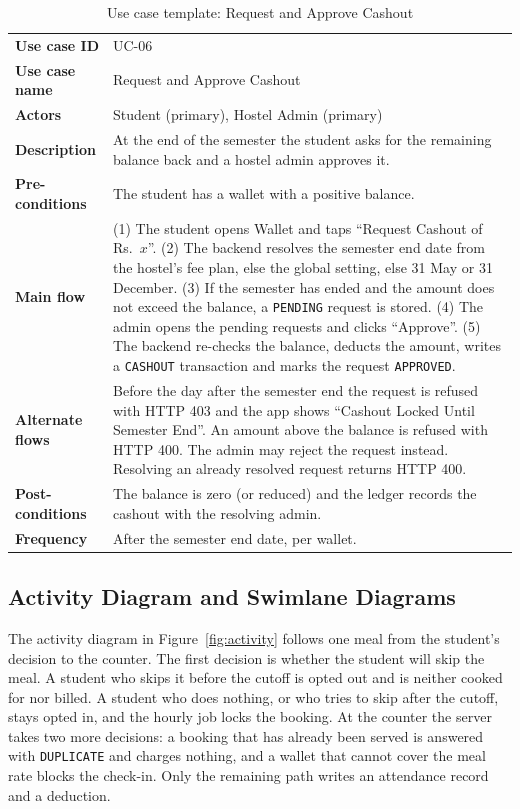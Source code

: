 \documentclass[11pt,a4paper]{article}
\begin{document}
\begin{table}[H]
\centering
\caption{Use case template: Request and Approve Cashout}
\label{tab:uc6}
\begin{tabular}{@{}L{3.1cm}L{11.7cm}@{}}
\toprule
\textbf{Use case ID} & UC-06\\
\textbf{Use case name} & Request and Approve Cashout\\
\textbf{Actors} & Student (primary), Hostel Admin (primary)\\
\textbf{Description} & At the end of the semester the student asks for the
remaining balance back and a hostel admin approves it.\\
\textbf{Pre-conditions} & The student has a wallet with a positive balance.\\
\textbf{Main flow} & (1) The student opens Wallet and taps ``Request Cashout of
Rs.~$x$''. (2) The backend resolves the semester end date from the hostel's fee
plan, else the global setting, else 31 May or 31 December. (3) If the semester
has ended and the amount does not exceed the balance, a \texttt{PENDING} request
is stored. (4) The admin opens the pending requests and clicks ``Approve''.
(5) The backend re-checks the balance, deducts the amount, writes a
\texttt{CASHOUT} transaction and marks the request \texttt{APPROVED}.\\
\textbf{Alternate flows} & Before the day after the semester end the request is
refused with HTTP 403 and the app shows ``Cashout Locked Until Semester End''.
An amount above the balance is refused with HTTP 400. The admin may reject the
request instead. Resolving an already resolved request returns HTTP 400.\\
\textbf{Post-conditions} & The balance is zero (or reduced) and the ledger
records the cashout with the resolving admin.\\
\textbf{Frequency} & After the semester end date, per wallet.\\
\bottomrule
\end{tabular}
\end{table}

\subsection{Activity Diagram and Swimlane Diagrams}

The activity diagram in Figure~\ref{fig:activity} follows one meal from the
student's decision to the counter. The first decision is whether the student
will skip the meal. A student who skips it before the cutoff is opted out and is
neither cooked for nor billed. A student who does nothing, or who tries to skip
after the cutoff, stays opted in, and the hourly job locks the booking. At the
counter the server takes two more decisions: a booking that has already been
served is answered with \texttt{DUPLICATE} and charges nothing, and a wallet that
cannot cover the meal rate blocks the check-in. Only the remaining path writes
an attendance record and a deduction.
\end{document}
